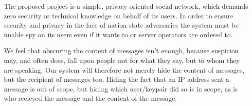 The proposed project is a simple, privacy oriented social
network, which demands zero security or technical knowledge on behalf of its
users. In order to ensure security and privacy in the face of nation state
adversaries the system must be unable spy on its users even if it wants to or
server operators are ordered to.

We feel that obscuring the content of messages isn't enough, because suspicion
may, and often does, fall upon people not for what they say, but to whom they
are speaking. Our system will therefore not merely hide
the content of messages, but the recipient of messages too. Hiding the fact that
an IP address sent a message is out of scope, but hiding which user/keypair did
so is in scope, as is who recieved the message and the content of the message.
